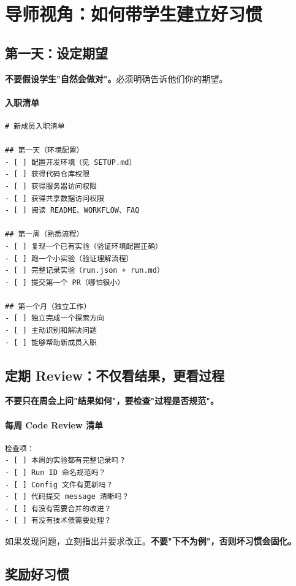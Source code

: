 \section{导师视角：如何带学生建立好习惯}

\subsection{第一天：设定期望}

\textbf{不要假设学生"自然会做对"。}必须明确告诉他们你的期望。

\paragraph{入职清单}

\begin{verbatim}
# 新成员入职清单

## 第一天（环境配置）
- [ ] 配置开发环境（见 SETUP.md）
- [ ] 获得代码仓库权限
- [ ] 获得服务器访问权限
- [ ] 获得共享数据访问权限
- [ ] 阅读 README、WORKFLOW、FAQ

## 第一周（熟悉流程）
- [ ] 复现一个已有实验（验证环境配置正确）
- [ ] 跑一个小实验（验证理解流程）
- [ ] 完整记录实验（run.json + run.md）
- [ ] 提交第一个 PR（哪怕很小）

## 第一个月（独立工作）
- [ ] 独立完成一个探索方向
- [ ] 主动识别和解决问题
- [ ] 能够帮助新成员入职
\end{verbatim}

\subsection{定期 Review：不仅看结果，更看过程}

\textbf{不要只在周会上问"结果如何"，要检查"过程是否规范"。}

\paragraph{每周 Code Review 清单}

\begin{verbatim}
检查项：
- [ ] 本周的实验都有完整记录吗？
- [ ] Run ID 命名规范吗？
- [ ] Config 文件有更新吗？
- [ ] 代码提交 message 清晰吗？
- [ ] 有没有需要合并的改进？
- [ ] 有没有技术债需要处理？
\end{verbatim}

如果发现问题，立刻指出并要求改正。\textbf{不要"下不为例"，否则坏习惯会固化。}

\subsection{奖励好习惯}

